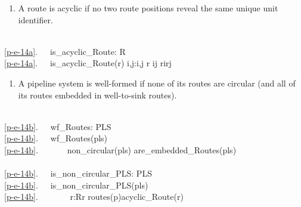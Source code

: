 \label{Wellformed Pipes}

\begin{enumerate}\setei
\item \label{p-e-14a}  A route is acyclic if no two route positions
  reveal the same unique unit identifier.
\savei\end{enumerate}
\bp
\>\ \\
\ref{p-e-14a}.\ \ \ is\_acyclic\_Route: R {\RIGHTARROW} \\
\ref{p-e-14a}.\ \ \ is\_acyclic\_Route(r) {\IS} {\SIM}{\EXISTS} i,j:i,j{\RBRACE}{\SUBSETEQ} r {\WEDGE} i{\NOTEQ}j {\WEDGE} r{\LBRACKET}i{\RBRACKET}{\EQ}r{\LBRACKET}j{\RBRACKET}
\ep

\mnewfoil

\begin{enumerate}\setei
\item \label{p-e-14b}  A pipeline system is well-formed if none of its
                      routes are circular (and all of its routes
                      embedded in well-to-sink routes). 
\savei\end{enumerate}
%
\bp
\>\ \\
\ref{p-e-14b}.\ \ \ wf\_Routes: PLS {\RIGHTARROW} \\
\ref{p-e-14b}.\ \ \ wf\_Routes(pls) {\IS}\ \ \label{pipe:wfRoutes}\\
\ref{p-e-14b}.\ \ \ \ \ \ \ non\_circular(pls) {\WEDGE} are\_embedded\_Routes(pls)\\
\\
\ref{p-e-14b}.\ \ \ is\_non\_circular\_PLS: PLS {\RIGHTARROW} \\
\ref{p-e-14b}.\ \ \ is\_non\_circular\_PLS(pls) {\IS} \\
\ref{p-e-14b}.\ \ \ \ \ \ \ {\ALL} r:R{\RDOT}r {\ISIN} routes(p){\WEDGE}acyclic\_Route(r)
\ep

